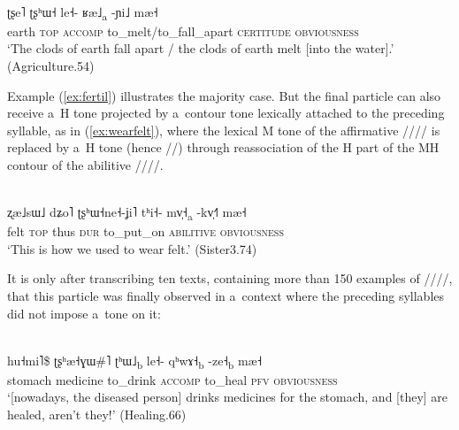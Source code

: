 \begin{exe}
	\ex
	\label{ex:fertil}
	\\
	\gll ʈʂe˥	ʈʂʰɯ˧	le˧-	ʁæ˩\textsubscript{a}		-ɲi˩		mæ˧\\
	earth	\textsc{top}	\textsc{accomp}		to\_melt/to\_fall\_apart	\textsc{certitude}		\textsc{obviousness}\\
	\glt ‘The clods of earth fall apart / the clods of earth melt [into the water].’ (Agriculture.54)
\end{exe}

Example (\ref{ex:fertil}) illustrates the majority case. But the final particle can also receive a~H tone projected by a~contour
tone lexically attached to the preceding syllable, as in (\ref{ex:wearfelt}), where the lexical M tone of the
affirmative //// is replaced by a~H tone (hence //) through reassociation of the H part of the MH contour of the
{{abilitive}} ////.

\begin{exe}
	\ex
	\label{ex:wearfelt}
	\\
	\gll ʐæ˩sɯ˩		dʑo˥		ʈʂʰɯ˧ne˧-ʝi˥	tʰi˧-		mv̩˧\textsubscript{a}		-kv̩˧˥		mæ˧\\
	felt	\textsc{top}	thus		\textsc{dur}		to\_put\_on		\textsc{abilitive}		\textsc{obviousness}\\
	\glt ‘This is how we used to wear felt.’ (Sister3.74)
\end{exe}

It is only after transcribing ten texts, containing more than 150 examples of ////, that
this particle was finally observed in a~context where the preceding syllables did not impose a~tone
on it: 

\begin{exe}
	\ex
	\label{ex:medicinesstom}
	\\
	\gll hu˧mi˥\$		ʈʂʰæ˧ɣɯ\#˥	ʈʰɯ˩\textsubscript{b}	le˧-	qʰwɤ˧\textsubscript{b}	-ze˧\textsubscript{b}		mæ˧\\
	stomach		medicine		to\_drink	\textsc{accomp}		to\_heal		\textsc{pfv}		\textsc{obviousness}\\
	\glt ‘[nowadays, the diseased person] drinks
	medicines for the stomach, and [they] are healed, aren’t they!’ (Healing.66)
\end{exe}

